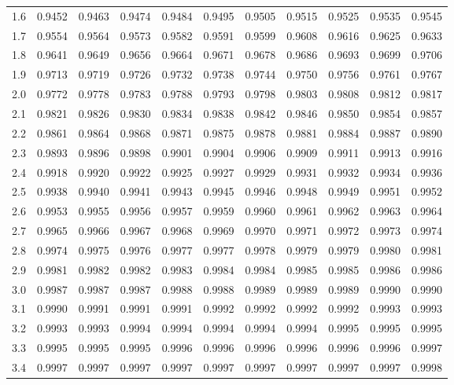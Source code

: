 \begin{table}[htbp]
\begin{tabular}{ccccccccccc}
		1.6  & 0.9452 & 0.9463 & 0.9474 & 0.9484 & 0.9495 & 0.9505 & 0.9515 & 0.9525 & 0.9535 & 0.9545 \\
		1.7  & 0.9554 & 0.9564 & 0.9573 & 0.9582 & 0.9591 & 0.9599 & 0.9608 & 0.9616 & 0.9625 & 0.9633 \\
		1.8  & 0.9641 & 0.9649 & 0.9656 & 0.9664 & 0.9671 & 0.9678 & 0.9686 & 0.9693 & 0.9699 & 0.9706 \\
		1.9  & 0.9713 & 0.9719 & 0.9726 & 0.9732 & 0.9738 & 0.9744 & 0.9750 & 0.9756 & 0.9761 & 0.9767 \\[5pt]
		2.0  & 0.9772 & 0.9778 & 0.9783 & 0.9788 & 0.9793 & 0.9798 & 0.9803 & 0.9808 & 0.9812 & 0.9817 \\
		2.1  & 0.9821 & 0.9826 & 0.9830 & 0.9834 & 0.9838 & 0.9842 & 0.9846 & 0.9850 & 0.9854 & 0.9857 \\
		2.2  & 0.9861 & 0.9864 & 0.9868 & 0.9871 & 0.9875 & 0.9878 & 0.9881 & 0.9884 & 0.9887 & 0.9890 \\
		2.3  & 0.9893 & 0.9896 & 0.9898 & 0.9901 & 0.9904 & 0.9906 & 0.9909 & 0.9911 & 0.9913 & 0.9916 \\
		2.4  & 0.9918 & 0.9920 & 0.9922 & 0.9925 & 0.9927 & 0.9929 & 0.9931 & 0.9932 & 0.9934 & 0.9936 \\
		2.5  & 0.9938 & 0.9940 & 0.9941 & 0.9943 & 0.9945 & 0.9946 & 0.9948 & 0.9949 & 0.9951 & 0.9952 \\
		2.6  & 0.9953 & 0.9955 & 0.9956 & 0.9957 & 0.9959 & 0.9960 & 0.9961 & 0.9962 & 0.9963 & 0.9964 \\
		2.7  & 0.9965 & 0.9966 & 0.9967 & 0.9968 & 0.9969 & 0.9970 & 0.9971 & 0.9972 & 0.9973 & 0.9974 \\
		2.8  & 0.9974 & 0.9975 & 0.9976 & 0.9977 & 0.9977 & 0.9978 & 0.9979 & 0.9979 & 0.9980 & 0.9981 \\
		2.9  & 0.9981 & 0.9982 & 0.9982 & 0.9983 & 0.9984 & 0.9984 & 0.9985 & 0.9985 & 0.9986 & 0.9986 \\[5pt]
		3.0  & 0.9987 & 0.9987 & 0.9987 & 0.9988 & 0.9988 & 0.9989 & 0.9989 & 0.9989 & 0.9990 & 0.9990 \\
		3.1  & 0.9990 & 0.9991 & 0.9991 & 0.9991 & 0.9992 & 0.9992 & 0.9992 & 0.9992 & 0.9993 & 0.9993 \\
		3.2  & 0.9993 & 0.9993 & 0.9994 & 0.9994 & 0.9994 & 0.9994 & 0.9994 & 0.9995 & 0.9995 & 0.9995 \\
		3.3  & 0.9995 & 0.9995 & 0.9995 & 0.9996 & 0.9996 & 0.9996 & 0.9996 & 0.9996 & 0.9996 & 0.9997 \\
		3.4  & 0.9997 & 0.9997 & 0.9997 & 0.9997 & 0.9997 & 0.9997 & 0.9997 & 0.9997 & 0.9997 & 0.9998 \\

\end{tabular}
\end{table}

